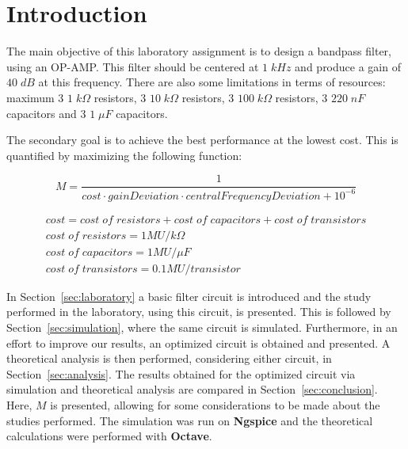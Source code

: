 \newpage

\section{Introduction}
\label{sec:introduction}

The main objective of this laboratory assignment is to design a bandpass filter, using an OP-AMP. This filter should be centered at $1\;kHz$ and produce a gain of $40\;dB$ at this frequency. There are also some limitations in terms of resources: maximum 3 $1\;k\Omega$ resistors, 3 $10\;k\Omega$ resistors, 3 $100\;k\Omega$ resistors, 3 $220\;nF$ capacitors and 3 $1\;\mu F$ capacitors. 

The secondary goal is to achieve the best performance at the lowest cost. This is quantified by maximizing the following function:

\begin{equation}
  M = \frac{1}{cost \cdot gainDeviation \cdot centralFrequencyDeviation + 10^{-6}}
\end{equation}

\begin{gather*}
  cost = cost\;of\;resistors + cost\;of\;capacitors + cost\;of\;transistors \\
  cost\;of\;resistors = 1 MU/k\Omega \\
  cost\;of\;capacitors = 1 MU/\mu F \\
  cost\;of\;transistors = 0.1 MU/transistor
\end{gather*}

In Section~\ref{sec:laboratory} a basic filter circuit is introduced and the study performed in the laboratory, using this circuit, is presented. This is followed by Section~\ref{sec:simulation}, where the same circuit is simulated. Furthermore, in an effort to improve our results, an optimized circuit is obtained and presented. A theoretical analysis is then performed, considering either circuit, in Section~\ref{sec:analysis}. The results obtained for the optimized circuit via simulation and theoretical analysis are compared in Section~\ref{sec:conclusion}. Here, $M$ is presented, allowing for some considerations to be made about the studies performed. The simulation was run on {\bf Ngspice} and the theoretical calculations were performed with {\bf Octave}.

